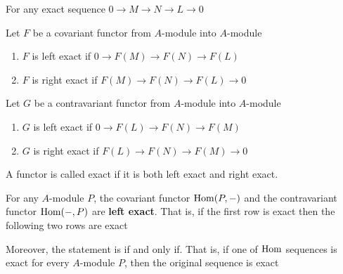 \begin{definition}
	For any exact sequence $0 \rightarrow M \rightarrow N \rightarrow L \rightarrow 0$
	
	Let $F$ be a covariant functor from $A$-module into $A$-module
	
	\begin{enumerate}
		\item $F$ is left exact if $0 \rightarrow F(M) \rightarrow F(N) \rightarrow F(L)$
		\item $F$ is right exact if $F(M) \rightarrow F(N) \rightarrow F(L) \rightarrow 0$
	\end{enumerate}
	
	Let $G$ be a contravariant functor from $A$-module into $A$-module
	
	\begin{enumerate}
		\item $G$ is left exact if $0 \to F(L) \to F(N) \to F(M)$
		\item $G$ is right exact if $F(L) \to F(N) \to F(M) \to 0$
	\end{enumerate}
	
	A functor is called exact if it is both left exact and right exact. 
	
\end{definition}

\begin{lemma}
	For any $A$-module $P$, the covariant functor $\operatorname{Hom}(P, -)$ and the contravariant functor $\operatorname{Hom}(-, P)$ are \textbf{left exact}. That is, if the first row is exact then the following two rows are exact 
	
	\begin{center}
	\end{center}

	Moreover, the statement is if and only if. That is, if one of $\operatorname{Hom}$ sequences is exact for every $A$-module $P$, then the original sequence is exact
\end{lemma}

